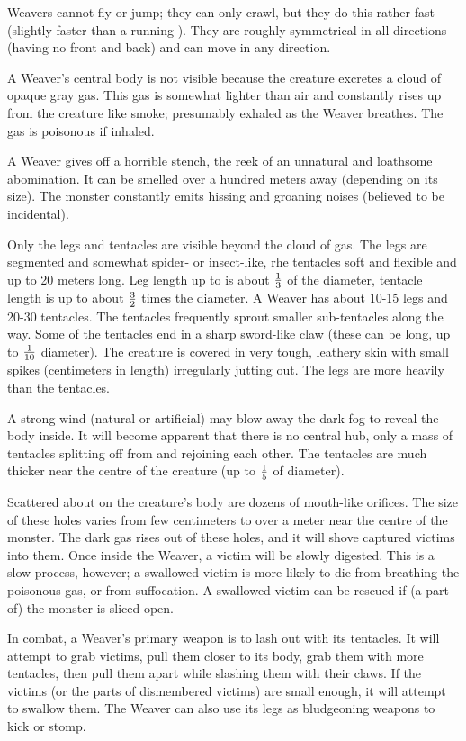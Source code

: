 Weavers cannot fly or jump; they can only crawl, but they do this rather fast (slightly faster than a running \human{}). They are roughly symmetrical in all directions (having no front and back) and can move in any direction. 

A Weaver's central body is not visible because the creature excretes a cloud of opaque gray gas. This gas is somewhat lighter than air and constantly rises up from the creature like smoke; presumably exhaled as the Weaver breathes. The gas is poisonous if inhaled. 

A Weaver gives off a horrible stench, the reek of an unnatural and loathsome abomination. It can be smelled over a hundred meters away (depending on its size). The monster constantly emits hissing and groaning noises (believed to be incidental). 

Only the legs and tentacles are visible beyond the cloud of gas. The legs are segmented and somewhat spider- or insect-like, rhe tentacles soft and flexible and up to 20 meters long. Leg length up to is about $\textstyle{\frac{1}{3}}$ of the diameter, tentacle length is up to about $\textstyle{\frac{3}{2}}$ times the diameter. A Weaver has about 10-15 legs and 20-30 tentacles. The tentacles frequently sprout smaller sub-tentacles along the way. Some of the tentacles end in a sharp sword-like claw (these can be long, up to $\textstyle{\frac{1}{10}}$ diameter). The creature is covered in very tough, leathery skin with small spikes (centimeters in length) irregularly jutting out. The legs are more heavily \armoured than the tentacles. 

A strong wind (natural or artificial) may blow away the dark fog to reveal the body inside. It will become apparent that there is no central hub, only a mass of tentacles splitting off from and rejoining each other. The tentacles are much thicker near the centre of the creature (up to $\textstyle{\frac{1}{5}}$ of diameter). 

Scattered about on the creature's body are dozens of mouth-like orifices. The size of these holes varies from few centimeters to over a meter near the centre of the monster. The dark gas rises out of these holes, and it will shove captured victims into them. Once inside the Weaver, a victim will be slowly digested. This is a slow process, however; a swallowed victim is more likely to die from breathing the poisonous gas, or from suffocation. A swallowed victim can be rescued if (a part of) the monster is sliced open. 

In combat, a Weaver's primary weapon is to lash out with its tentacles. It will attempt to grab victims, pull them closer to its body, grab them with more tentacles, then pull them apart while slashing them with their claws. If the victims (or the parts of dismembered victims) are small enough, it will attempt to swallow them. The Weaver can also use its legs as bludgeoning weapons to kick or stomp. 

